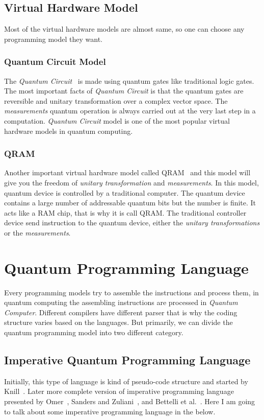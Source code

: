 \documentclass[11pt, conference, onecolumn]{IEEEtran}
\begin{document}
\subsection{Virtual Hardware Model}
Most of the virtual hardware models are almost same, so one can choose any programming model they want.

\subsubsection{Quantum Circuit Model}
The \textit{Quantum Circuit}~\cite{yao1993quantum} is made using quantum gates like traditional logic gates. The most important facts of \textit{Quantum Circuit} is that the quantum gates 
are reversible and unitary transformation over a complex vector space. The \textit{measurements} quantum operation is always carried out at the very last step in a computation. 
\textit{Quantum Circuit} model is one of the most popular virtual hardware models in quantum computing.

\subsubsection{QRAM}
Another important virtual hardware model called QRAM~\cite{knill1996conventions} and this model will give you the freedom of  \textit{unitary transformation} and \textit{measurements}. 
In this model, quantum device is controlled by a traditional computer. The quantum device contains a large number of addressable quantum bits but the number is finite. It acts like a 
RAM chip, that is why it is call QRAM. The traditional controller device send instruction to the quantum device, either the \textit{unitary transformations} or the \textit{measurements}.

\section{Quantum Programming Language}
Every programming models try to assemble the instructions and process them, in quantum computing the assembling instructions are processed in \textit{Quantum Computer}. Different compilers 
have different parser that is why the coding structure varies based on the languages. But primarily, we can divide the quantum programming model into two different category.  

\subsection{Imperative Quantum Programming Language}
Initially, this type of language is kind of pseudo-code structure and started by Knill~\cite{knill1996conventions}. Later more complete version of imperative programming language 
presented by Omer~\cite{omer1998procedural}, Sanders and Zuliani~\cite{sanders2000quantum}, and Bettelli et al.~\cite{bettelli2003toward}. Here I am going to talk about some 
imperative programming language in the below.
\end{document}
